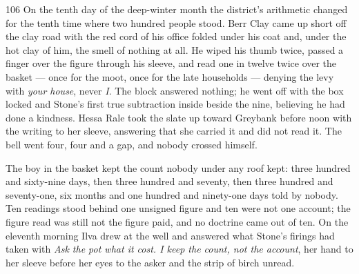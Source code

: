 
\scenebreak


\scenebreak


\scenebreak

\CRtailpiece
\begin{CRchronicle}{106}
On the tenth day of the deep-winter month the district’s arithmetic changed for the tenth time where two hundred people stood. Berr Clay came up short off the clay road with the red cord of his office folded under his coat and, under the hot clay of him, the smell of nothing at all. He wiped his thumb twice, passed a finger over the figure through his sleeve, and read one in twelve twice over the basket --- once for the moot, once for the late households --- denying the levy with \emph{your house}, never \emph{I}. The block answered nothing; he went off with the box locked and Stone’s first true subtraction inside beside the nine, believing he had done a kindness. Hessa Rale took the slate up toward Greybank before noon with the writing to her sleeve, answering that she carried it and did not read it. The bell went four, four and a gap, and nobody crossed himself.

The boy in the basket kept the count nobody under any roof kept: three hundred and sixty-nine days, then three hundred and seventy, then three hundred and seventy-one, six months and one hundred and ninety-one days told by nobody. Ten readings stood behind one unsigned figure and ten were not one account; the figure read was still not the figure paid, and no doctrine came out of ten. On the eleventh morning Ilva drew at the well and answered what Stone’s firings had taken with \emph{Ask the pot what it cost. I keep the count, not the account}, her hand to her sleeve before her eyes to the asker and the strip of birch unread.


\end{CRchronicle}
